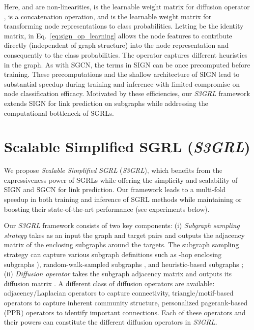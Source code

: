 \documentclass[sigconf, nonacm]{acmart}
\newcommand{\ssgrl}{\textit{S3GRL}\xspace}
\begin{document}
Here,  and  are non-linearities,  is the learnable weight matrix for diffusion operator ,  is a concatenation operation, and  is the learnable weight matrix for transforming node representations to class probabilities. Letting  be the identity matrix,   in Eq.~\ref{eq:sign_op_learning} allows the node features to contribute directly (independent of graph structure) into the node representation and consequently to the class probabilities. The  operator captures different heuristics in the graph. As with SGCN, the terms  in SIGN can be once precomputed before training. These precomputations and the shallow architecture of SIGN lead to substantial speedup during training and inference with limited compromise on node classification efficacy. Motivated by these efficiencies, our \ssgrl framework extends SIGN for link prediction on subgraphs while addressing the computational bottleneck of SGRLs.

\section{Scalable Simplified  SGRL (\ssgrl)}
We propose \textit{Scalable Simplified  SGRL} (\ssgrl), which benefits from the expressiveness power of SGRLs while offering the simplicity and scalability of SIGN and SGCN for link prediction. Our framework leads to a multi-fold speedup in both training and inference of SGRL methods while maintaining or boosting their state-of-the-art performance (see experiments below). 

Our \ssgrl framework consists of two key components: (i) \emph{Subgraph sampling strategy}  takes as an input the graph  and target pairs  and outputs the adjacency matrix  of the enclosing subgraphs  around the targets. The subgraph sampling strategy  can capture various subgraph definitions such as -hop enclosing subgraphs \cite{zhang2018link}), random-walk-sampled subgraphs \cite{yin2022algorithm,louis2022sampling}, and heuristic-based subgraphs \cite{zeng2021decoupling}; (ii) \emph{Diffusion operator}   takes the subgraph adjacency matrix  and outputs its diffusion matrix . A different class of diffusion operators are available: adjacency/Laplacian operators to capture connectivity, triangle/motif-based operators \cite{granovetter1983strength} to capture inherent community structure, personalized pagerank-based (PPR) operators \cite{gasteiger2019diffusion} to identify important connections. Each of these operators and their powers can constitute the different diffusion operators in \ssgrl.
\end{document}
